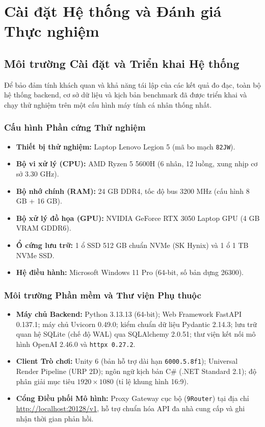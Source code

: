 \chapter{Cài đặt Hệ thống và Đánh giá Thực nghiệm}
\label{ch:evaluation}

\section{Môi trường Cài đặt và Triển khai Hệ thống}
\label{sec:eval_environment}

Để bảo đảm tính khách quan và khả năng tái lập của các kết quả đo đạc, toàn bộ hệ thống backend, cơ sở dữ liệu và kịch bản benchmark đã được triển khai và chạy thử nghiệm trên một cấu hình máy tính cá nhân thống nhất.

\subsection{Cấu hình Phần cứng Thử nghiệm}
\begin{itemize}[leftmargin=1.5cm]
    \item \textbf{Thiết bị thử nghiệm:} Laptop Lenovo Legion 5 (mã bo mạch \texttt{82JW}).
    \item \textbf{Bộ vi xử lý (CPU):} AMD Ryzen 5 5600H (6 nhân, 12 luồng, xung nhịp cơ sở 3.30 GHz).
    \item \textbf{Bộ nhớ chính (RAM):} 24 GB DDR4, tốc độ bus 3200 MHz (cấu hình 8 GB + 16 GB).
    \item \textbf{Bộ xử lý đồ họa (GPU):} NVIDIA GeForce RTX 3050 Laptop GPU (4 GB VRAM GDDR6).
    \item \textbf{Ổ cứng lưu trữ:} 1 ổ SSD 512 GB chuẩn NVMe (SK Hynix) và 1 ổ 1 TB NVMe SSD.
    \item \textbf{Hệ điều hành:} Microsoft Windows 11 Pro (64-bit, số bản dựng 26300).
\end{itemize}

\subsection{Môi trường Phần mềm và Thư viện Phụ thuộc}
\begin{itemize}[leftmargin=1.5cm]
    \item \textbf{Máy chủ Backend:} Python 3.13.13 (64-bit); Web Framework FastAPI 0.137.1; máy chủ Uvicorn 0.49.0; kiểm chuẩn dữ liệu Pydantic 2.14.3; lưu trữ quan hệ SQLite (chế độ WAL) qua SQLAlchemy 2.0.51; thư viện kết nối mô hình OpenAI 2.46.0 và \texttt{httpx 0.27.2}.
    \item \textbf{Client Trò chơi:} Unity 6 (bản hỗ trợ dài hạn \texttt{6000.5.8f1}); Universal Render Pipeline (URP 2D); ngôn ngữ kịch bản C\# (.NET Standard 2.1); độ phân giải mục tiêu $1920\times 1080$ (tỉ lệ khung hình 16:9).
    \item \textbf{Cổng Điều phối Mô hình:} Proxy Gateway cục bộ (\texttt{9Router}) tại địa chỉ \url{http://localhost:20128/v1}, hỗ trợ chuẩn hóa API đa nhà cung cấp và ghi nhận thời gian phản hồi.
\end{itemize}

